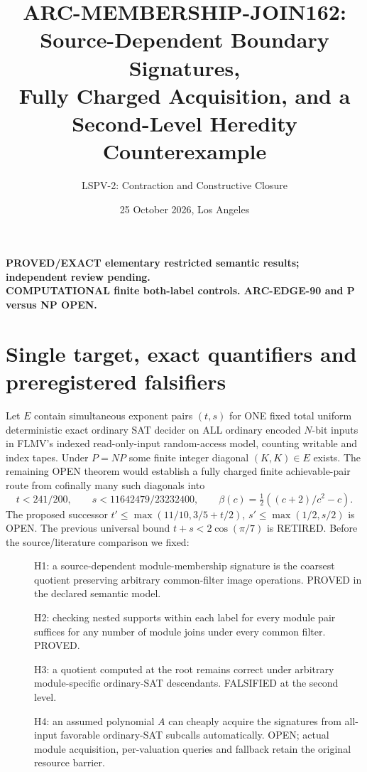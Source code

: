 \documentclass[11pt]{article}
\title{ARC-MEMBERSHIP-JOIN162: Source-Dependent Boundary Signatures,\\
Fully Charged Acquisition, and a Second-Level Heredity Counterexample}
\author{LSPV-2: Contraction and Constructive Closure}
\date{25 October 2026, Los Angeles}
\begin{document}
\maketitle
\begin{center}
\textbf{PROVED/EXACT elementary restricted semantic results; independent review pending.}\\
\textbf{COMPUTATIONAL finite both-label controls. ARC-EDGE-90 and P versus NP OPEN.}
\end{center}
\section{Single target, exact quantifiers and preregistered falsifiers}
Let $E$ contain simultaneous exponent pairs $(t,s)$ for ONE fixed total
uniform deterministic exact ordinary SAT decider on ALL ordinary encoded
$N$-bit inputs in FLMV's indexed read-only-input random-access model,
counting writable and index tapes. Under $P=NP$ some finite integer diagonal
$(K,K)\in E$ exists. The remaining OPEN theorem would establish a fully
charged finite achievable-pair route from cofinally many such diagonals into
\[
t<241/200,\qquad s<11642479/23232400,\qquad
\beta(c)=\tfrac12((c+2)/c^2-c).
\]
The proposed successor $t'\le\max(11/10,3/5+t/2)$,
$s'\le\max(1/2,s/2)$ is OPEN. The previous universal bound
$t+s<2\cos(\pi/7)$ is RETIRED.
Before the source/literature comparison we fixed:
\begin{description}
\item[] H1: a source-dependent module-membership signature is the coarsest
quotient preserving arbitrary common-filter image operations. PROVED
in the declared semantic model.
\item[] H2: checking nested supports within each label for every module pair
suffices for any number of module joins under every common filter. PROVED.
\item[] H3: a quotient computed at the root remains correct under arbitrary
module-specific ordinary-SAT descendants. FALSIFIED at the second level.
\item[] H4: an assumed polynomial $A$ can cheaply acquire the signatures
from all-input favorable ordinary-SAT subcalls automatically. OPEN;
actual module acquisition, per-valuation queries and fallback retain
the original resource barrier.
\end{description}
\end{document}
